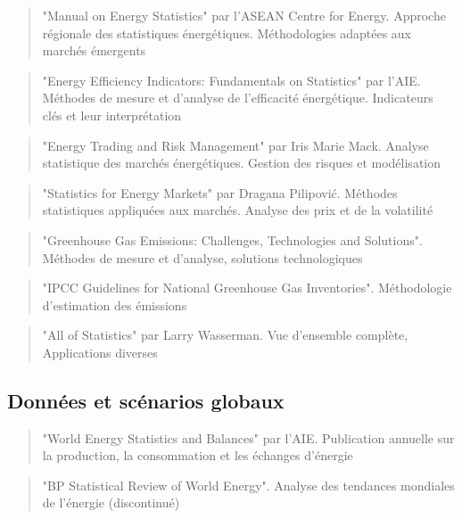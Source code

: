 \documentclass[a4paper,11pt]{report}
\begin{document}
\begin{quote}
"Manual on Energy Statistics" par l'ASEAN Centre for Energy. Approche régionale des statistiques énergétiques. Méthodologies adaptées aux marchés émergents
\end{quote}

\begin{quote}
"Energy Efficiency Indicators: Fundamentals on Statistics" par l'AIE. Méthodes de mesure et d'analyse de l'efficacité énergétique. Indicateurs clés et leur interprétation
\end{quote}

\begin{quote}
"Energy Trading and Risk Management" par Iris Marie Mack. Analyse statistique des marchés énergétiques. Gestion des risques et modélisation
\end{quote}

\begin{quote}
"Statistics for Energy Markets" par Dragana Pilipović. Méthodes statistiques appliquées aux marchés. Analyse des prix et de la volatilité
\end{quote}

\begin{quote}
"Greenhouse Gas Emissions: Challenges, Technologies and Solutions". Méthodes de mesure et d'analyse, solutions technologiques
\end{quote}

\begin{quote}
"IPCC Guidelines for National Greenhouse Gas Inventories". Méthodologie d'estimation des émissions
\end{quote}

\begin{quote}
"All of Statistics" par Larry Wasserman. Vue d'ensemble complète, Applications diverses
\end{quote}

\subsection{Données et scénarios globaux}\label{donnuxe9es-et-scuxe9narios-globaux}

\begin{quote}
"World Energy Statistics and Balances" par l'AIE. Publication annuelle sur la production, la consommation et les échanges d'énergie
\end{quote}

\begin{quote}
"BP Statistical Review of World Energy". Analyse des tendances mondiales de l'énergie (discontinué)
\end{quote}
\end{document}
